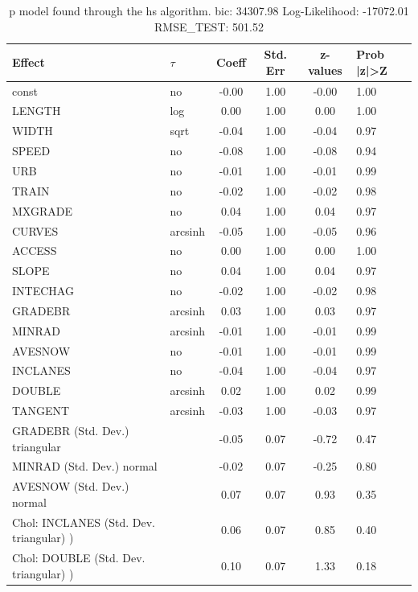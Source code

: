 \begin{table}
	\caption{p model found through the hs algorithm. bic: 34307.98 Log-Likelihood: -17072.01 RMSE_TEST: 501.52}
	\begin{center}
		\begin{tabular}{|l|l|c|c|c|l|}
			\hline
			Effect & $\tau$ & Coeff & Std. Err & z-values & Prob |z|>Z \\
			\hline
			const & no & -0.00 & 1.00 & -0.00 & 1.00 \\
			\hline
			LENGTH & log & 0.00 & 1.00 & 0.00 & 1.00 \\
			\hline
			WIDTH & sqrt & -0.04 & 1.00 & -0.04 & 0.97 \\
			\hline
			SPEED & no & -0.08 & 1.00 & -0.08 & 0.94 \\
			\hline
			URB & no & -0.01 & 1.00 & -0.01 & 0.99 \\
			\hline
			TRAIN & no & -0.02 & 1.00 & -0.02 & 0.98 \\
			\hline
			MXGRADE & no & 0.04 & 1.00 & 0.04 & 0.97 \\
			\hline
			CURVES & arcsinh & -0.05 & 1.00 & -0.05 & 0.96 \\
			\hline
			ACCESS & no & 0.00 & 1.00 & 0.00 & 1.00 \\
			\hline
			SLOPE & no & 0.04 & 1.00 & 0.04 & 0.97 \\
			\hline
			INTECHAG & no & -0.02 & 1.00 & -0.02 & 0.98 \\
			\hline
			GRADEBR & arcsinh & 0.03 & 1.00 & 0.03 & 0.97 \\
			\hline
			MINRAD & arcsinh & -0.01 & 1.00 & -0.01 & 0.99 \\
			\hline
			AVESNOW & no & -0.01 & 1.00 & -0.01 & 0.99 \\
			\hline
			INCLANES & no & -0.04 & 1.00 & -0.04 & 0.97 \\
			\hline
			DOUBLE & arcsinh & 0.02 & 1.00 & 0.02 & 0.99 \\
			\hline
			TANGENT & arcsinh & -0.03 & 1.00 & -0.03 & 0.97 \\
			\hline
			GRADEBR (Std. Dev.) triangular &  & -0.05 & 0.07 & -0.72 & 0.47 \\
			\hline
			MINRAD (Std. Dev.) normal &  & -0.02 & 0.07 & -0.25 & 0.80 \\
			\hline
			AVESNOW (Std. Dev.) normal &  & 0.07 & 0.07 & 0.93 & 0.35 \\
			\hline
			 Chol: INCLANES (Std. Dev. triangular) ) &  & 0.06 & 0.07 & 0.85 & 0.40 \\
			\hline
			 Chol: DOUBLE (Std. Dev. triangular) ) &  & 0.10 & 0.07 & 1.33 & 0.18 \\

\end{tabular}
\end{center}
\end{table}
